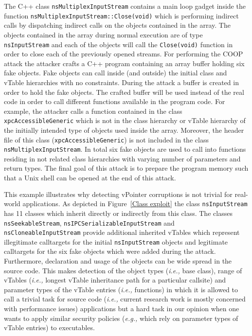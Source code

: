 The C++ class \texttt{nsMultiplexInputStream} contains a main loop gadget inside the function 
\texttt{nsMultiplexInputStream::Close(void)} which is performing indirect calls by dispatching
indirect calls on the objects contained in the array. 
The objects contained in the array during normal execution are of type \texttt{nsInputStream} and each
of the objects will call the \texttt{Close(void)} function in order to close each of the previously opened streams.
For performing the COOP attack the attacker crafts a C++ program containing an array buffer holding 
six fake objects. Fake objects can call inside (and outside) the initial class and vTable hierarchies
with no constraints.
During the attack a buffer is created in order to hold the fake objects.
The crafted buffer will be used instead of the real code in order to call different functions
available in the program code. For example, the attacker calls a function contained in the class
\texttt{xpcAccessibleGeneric} which is not in the class hierarchy or vTable hierarchy
of the initially intended type of objects used inside the array.
Moreover, the header file of this class (\texttt{xpcAccessibleGeneric}) is not included in the 
class \texttt{nsMultiplexInputStream}.
In total six fake objects are used to call into functions residing in not related class hierarchies with varying 
number of parameters and return types. The final goal of this attack is to prepare the program memory such 
that a Unix shell can be opened at the end of this attack.

This example illustrates why detecting vPointer corruptions is not trivial for real-world applications.
As depicted in Figure~\ref{Class exploit} the class \texttt{nsInputStream} has 11 classes which inherit directly
or indirectly from this class. The classes \texttt{nsSeekableStream}, \texttt{nsIPCSerializableInputStream}
and \texttt{nsCloneableInputStream} provide additional inherited vTables which represent illegitimate calltargets
for the initial \texttt{nsInputStream} objects and legitimate calltargets for the six fake objects which were added during the attack.
Furthermore, declaration and usage of the objects can be wide spread in the source code. This makes
detection of the object types (\textit{i.e.,} base class), range of vTables (\textit{i.e.,} longest vTable inheritance path for a particular callsite)
and parameter types of the vTable entries (\textit{i.e.,} functions) in which it is allowed to call a 
trivial task for source code (\textit{i.e.,} current research work is mostly concerned with performance issues)
applications but a hard task in our opinion when one wants to apply similar security policies 
(\textit{e.g.,} which rely on parameter types of vTable entries) to executables.





